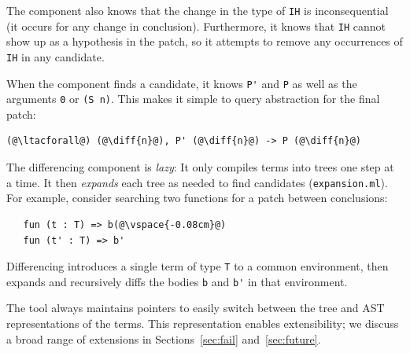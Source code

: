 The component also knows that the change in the type of \lstinline{IH} is inconsequential (it occurs for any change in conclusion).
Furthermore, it knows that \lstinline{IH} cannot show up as a hypothesis in the patch,
so it attempts to remove any occurrences of \lstinline{IH} in any candidate.

When the component finds a candidate, it knows \lstinline{P'} and \lstinline{P}
as well as the arguments \lstinline{0} or \lstinline{(S n)}. This makes it simple
to query abstraction for the final patch:

\begin{lstlisting}[language=coq]
    (@\ltacforall@) (@\diff{n}@), P' (@\diff{n}@) -> P (@\diff{n}@)
\end{lstlisting}

The differencing component is \textit{lazy}: It only compiles terms into trees one step at a time.
It then \emph{expands} each tree as needed to find candidates (\lstinline{expansion.ml}).
For example, consider searching two functions for a patch between conclusions:

\begin{lstlisting}
   fun (t : T) => b(@\vspace{-0.08cm}@)
   fun (t' : T) => b'
\end{lstlisting}

Differencing introduces a single term of type \lstinline{T} to a common environment,
then expands and recursively diffs the bodies \lstinline{b} and \lstinline{b'} in that environment.

The tool always maintains pointers to easily switch between the tree and AST representations of
the terms. %
This representation enables extensibility; we discuss a broad range of extensions
in Sections~\ref{sec:fail} and~\ref{sec:future}.

